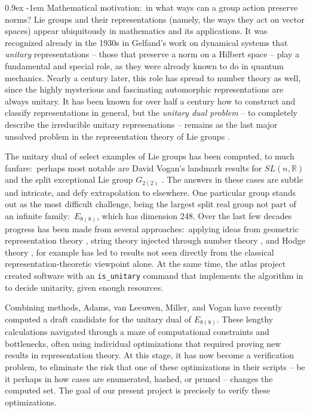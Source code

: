 \documentclass{easychair}
\makeatletter
\def\atlas{\textsf{atlas}\xspace}
\renewcommand\paragraph{\@startsection{paragraph}{4}{\z@}%
  {0.9ex}   %
  {-1em}    %
  {\normalfont\normalsize\bfseries}}
\makeatother
\begin{document}
\paragraph{Mathematical motivation:~in what ways can a group action preserve norms?}
Lie groups and their representations (namely, the ways they act on vector spaces) appear ubiquitously in mathematics and its applications.  It was recognized already in the 1930s in Gelfand's work on dynamical systems that {\it unitary} representations -- those that preserve a norm on a Hilbert space -- play a fundamental and special role, as they were already known to do in quantum mechanics.
%
Nearly a century later, this role has spread to number theory as well, since the highly mysterious and fascinating automorphic representations are always unitary.  It has been known for over half a century how to construct and classify representations in general, but the \emph{unitary dual problem} -- to completely describe the irreducible unitary represenations -- remains as the last major unsolved problem in the representation theory of Lie groups \cite{Knapp2001}.

The unitary dual of select examples of  Lie groups has been computed, to much fanfare:~perhaps most notable are David Vogan's landmark results for $SL(n,\mathbb{R})$ \cite{VoganSLnR} and the split exceptional Lie group $G_{2(2)}$ \cite{VoganG2}.  The answers in these cases are subtle and intricate, and defy extrapolation to elsewhere.  One particular group stands out as the most difficult challenge, being the largest split real group not part of an infinite family:~$E_{8(8)}$, which has dimension 248.
%
Over the last few decades progress has been made from several approaches:~applying ideas from geometric representation theory \cite{AdamsvanLeeuwenTrapaVogan2020}, string theory injected through number theory \cite{GreenMillerVanhove2015}, and Hodge theory \cite{SchmidVilonen2011,DavisMasonBrownFPP}, for example has led to results not seen directly from the classical representation-theoretic viewpoint alone.  At the same time, the \atlas project \cite{AtlasProject} created software with an {\tt is\_unitary} command that implements the algorithm in \cite{AdamsvanLeeuwenTrapaVogan2020} to decide unitarity, given enough resources.

Combining methods, Adams, van Leeuwen, Miller, and Vogan have recently computed a draft candidate for the unitary dual of $E_{8(8)}$.
These lengthy calculations navigated through a maze of computational constraints and bottlenecks, often using individual optimizations that required  proving new results in representation theory.  At this stage, it has now become a verification problem, to eliminate the risk that one of these optimizations in their scripts -- be it perhaps in how cases are enumerated, hashed, or pruned -- changes the computed set.  The goal of our present project is precisely to verify these optimizations.
\end{document}
